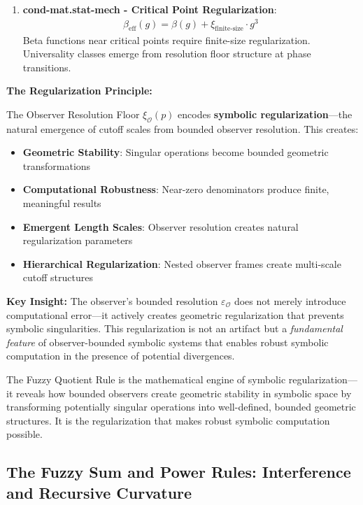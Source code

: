 \begin{scholium}
\begin{enumerate}
\item \textbf{cond-mat.stat-mech - Critical Point Regularization}:
   \begin{align}
   \beta_{\text{eff}}(g) = \beta(g) + \xi_{\text{finite-size}} \cdot g^3
   \end{align}
   Beta functions near critical points require finite-size regularization. Universality classes emerge from resolution floor structure at phase transitions.
\end{enumerate}
\end{scholium}

\textbf{The Regularization Principle:}

The Observer Resolution Floor $\xi_{\mathcal{O}}(p)$ encodes \textbf{symbolic regularization}---the natural emergence of cutoff scales from bounded observer resolution. This creates:

\begin{itemize}
\item \textbf{Geometric Stability}: Singular operations become bounded geometric transformations
\item \textbf{Computational Robustness}: Near-zero denominators produce finite, meaningful results
\item \textbf{Emergent Length Scales}: Observer resolution creates natural regularization parameters
\item \textbf{Hierarchical Regularization}: Nested observer frames create multi-scale cutoff structures
\end{itemize}

\textbf{Key Insight:} The observer's bounded resolution $\varepsilon_{\mathcal{O}}$ does not merely introduce computational error---it actively creates geometric regularization that prevents symbolic singularities. This regularization is not an artifact but a \textit{fundamental feature} of observer-bounded symbolic systems that enables robust symbolic computation in the presence of potential divergences.

The Fuzzy Quotient Rule is the mathematical engine of symbolic regularization---it reveals how bounded observers create geometric stability in symbolic space by transforming potentially singular operations into well-defined, bounded geometric structures. It is the regularization that makes robust symbolic computation possible.

\subsection{The Fuzzy Sum and Power Rules: Interference and Recursive Curvature}
\label{subsec:bk4_fuzzy_sum_power}

